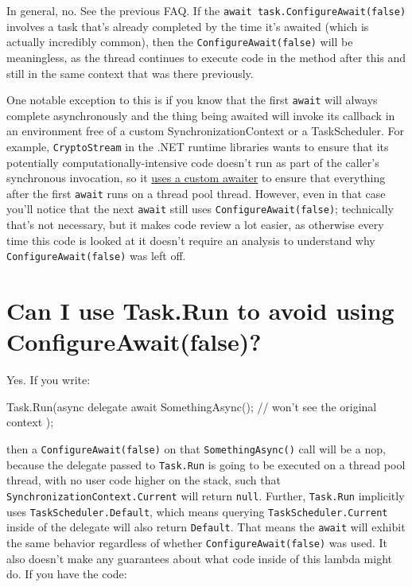 \documentclass[a4paper,12pt,notitlepage,twoside,openright]{article}
\begin{document}
In general, no. See the previous FAQ. If the
\texttt{await\ task.ConfigureAwait(false)} involves a task that's
already completed by the time it's awaited (which is actually incredibly
common), then the \texttt{ConfigureAwait(false)} will be meaningless, as
the thread continues to execute code in the method after this and still
in the same context that was there previously.

One notable exception to this is if you know that the first
\texttt{await} will always complete asynchronously and the thing being
awaited will invoke its callback in an environment free of a custom
SynchronizationContext or a TaskScheduler. For example,
\texttt{CryptoStream} in the .NET runtime libraries wants to ensure that
its potentially computationally-intensive code doesn't run as part of
the caller's synchronous invocation, so it
\href{https://github.com/dotnet/runtime/blob/4f9ae42d861fcb4be2fcd5d3d55d5f227d30e723/src/libraries/System.Security.Cryptography.Primitives/src/System/Security/Cryptography/CryptoStream.cs\#L205}{uses
a custom awaiter} to ensure that everything after the first
\texttt{await} runs on a thread pool thread. However, even in that case
you'll notice that the next \texttt{await} still uses
\texttt{ConfigureAwait(false)}; technically that's not necessary, but it
makes code review a lot easier, as otherwise every time this code is
looked at it doesn't require an analysis to understand why
\texttt{ConfigureAwait(false)} was left off.

\hypertarget{can-i-use-task.run-to-avoid-using-configureawaitfalse}{%
\section{Can I use Task.Run to avoid using
ConfigureAwait(false)?}\label{can-i-use-task.run-to-avoid-using-configureawaitfalse}}

Yes. If you write:

\begin{csharpcode}
Task.Run(async delegate
{
    await SomethingAsync(); // won't see the original context
});
\end{csharpcode}

then a \texttt{ConfigureAwait(false)} on that \texttt{SomethingAsync()}
call will be a nop, because the delegate passed to \texttt{Task.Run} is
going to be executed on a thread pool thread, with no user code higher
on the stack, such that \texttt{SynchronizationContext.Current} will
return \texttt{null}. Further, \texttt{Task.Run} implicitly uses
\texttt{TaskScheduler.Default}, which means querying
\texttt{TaskScheduler.Current} inside of the delegate will also return
\texttt{Default}. That means the \texttt{await} will exhibit the same
behavior regardless of whether \texttt{ConfigureAwait(false)} was used.
It also doesn't make any guarantees about what code inside of this
lambda might do. If you have the code:
\end{document}
